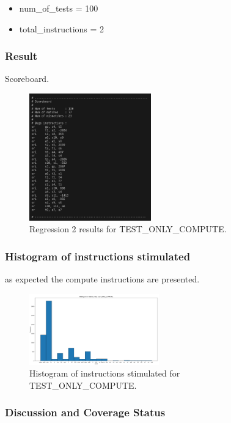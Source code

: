 \begin{itemize}
    \item num\_of\_tests = 100
    \item total\_instructions = 2
\end{itemize}

\subsubsection{Result}
Scoreboard.

\begin{figure}[H]
    \centering
    \includegraphics[width=0.47\textwidth]{./c3l1_img/toc_100_r.png}
    \caption{Regression 2 results for TEST\_ONLY\_COMPUTE.}
    \label{fig:toc_100_r}
\end{figure}

\subsubsection{Histogram of instructions stimulated}
as expected the compute instructions are presented.


\begin{figure}[H]
    \centering
    \includegraphics[width=0.5\textwidth]{./c3l1_img/toc_100.png}
    \caption{Histogram of instructions stimulated for TEST\_ONLY\_COMPUTE.}
    \label{fig:toc_100}
\end{figure}

\subsubsection{Discussion and Coverage Status}

